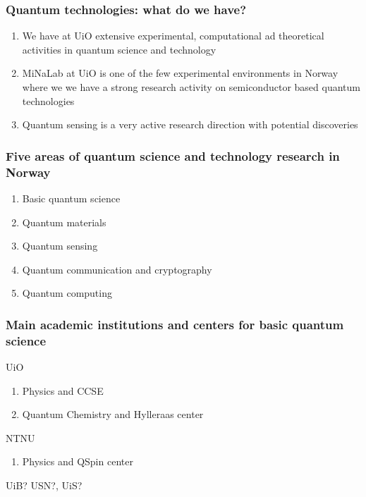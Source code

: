 \documentclass{beamer}
\begin{document}
\begin{frame}
\frametitle{Quantum technologies: what do we have?}

\begin{enumerate}
\item We have at UiO extensive experimental, computational ad theoretical activities in quantum science and technology

\item MiNaLab at UiO is one of the few experimental environments in Norway where we we have a strong research activity on semiconductor based quantum technologies 

\item Quantum sensing is a very active research direction with potential discoveries
\end{enumerate}

\noindent
\end{frame}

\begin{frame}
\frametitle{Five areas of quantum science and technology research in Norway}

\begin{block}{}
\begin{enumerate}
\item Basic quantum science

\item Quantum materials

\item Quantum sensing

\item Quantum communication and cryptography

\item Quantum computing
\end{enumerate}

\noindent
\end{block}
\end{frame}

\begin{frame}
\frametitle{Main academic institutions and centers for basic quantum science}

\begin{block}{UiO }
\begin{enumerate}
\item Physics and CCSE

\item Quantum Chemistry and Hylleraas center
\end{enumerate}

\noindent
\end{block}

\begin{block}{NTNU }
\begin{enumerate}
\item Physics and QSpin center
\end{enumerate}

\noindent
\end{block}

UiB? USN?, UiS?
\end{frame}
\end{document}
